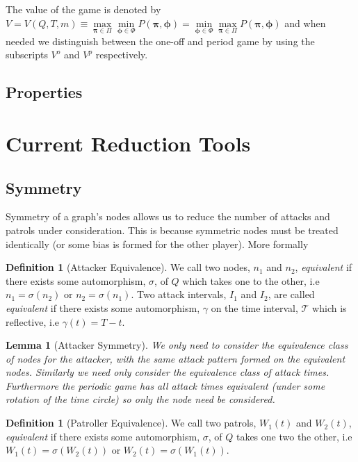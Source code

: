 \documentclass[a4paper,10pt]{article}
\newtheorem{lemma}[theorem]{Lemma}
\theoremstyle{definition}
\newtheorem{definition}[theorem]{Definition}
\theoremstyle{definition}
\theoremstyle{remark}
\theoremstyle{definition}
\begin{document}
The value of the game is denoted by $V=V(Q,T,m) \equiv \max\limits_{\bm{\pi} \in \Pi} \min\limits_{\bm{\phi} \in \Phi} P(\bm{\pi},\bm{\phi})=\min\limits_{\bm{\phi} \in \Phi} \max\limits_{\bm{\pi} \in \Pi} P(\bm{\pi},\bm{\phi})$ and when needed we distinguish between the one-off and period game by using the subscripts $V^{o}$ and $V^p$ respectively.

\subsection{Properties}


\section{Current Reduction Tools}


\subsection{Symmetry}
Symmetry of a graph's nodes allows us to reduce the number of attacks and patrols under consideration. This is because symmetric nodes must be treated identically (or some bias is formed for the other player). More formally

\begin{definition}[Attacker Equivalence]
We call two nodes, $n_{1}$ and $n_{2}$, \textit{equivalent} if there exists some automorphism, $\sigma$, of $Q$ which takes one to the other, i.e $n_{1}=\sigma (n_{2})$ or $n_{2}=\sigma (n_{1})$. Two attack intervals, $I_{1}$ and $I_{2}$, are called \textit{equivalent}  if there exists some automorphism, $\gamma$ on the time interval, $\mathcal{T}$ which is reflective, i.e $\gamma(t)=T-t$.
\end{definition}

\begin{lemma}[Attacker Symmetry]
We only need to consider the equivalence class of nodes for the attacker, with the same attack pattern formed on the equivalent nodes. Similarly we need only consider the equivalence class of attack times. Furthermore the periodic game has all attack times equivalent (under some rotation of the time circle) so only the node need be considered.
\end{lemma}

\begin{definition}[Patroller Equivalence]
We call two patrols, $W_{1}(t)$ and $W_{2}(t)$, \textit{equivalent} if there exists some automorphism, $\sigma$, of $Q$ takes one two the other, i.e $W_{1}(t)=\sigma (W_{2}(t))$ or $W_{2}(t)=\sigma (W_{1}(t))$.
\end{definition}
\end{document}
